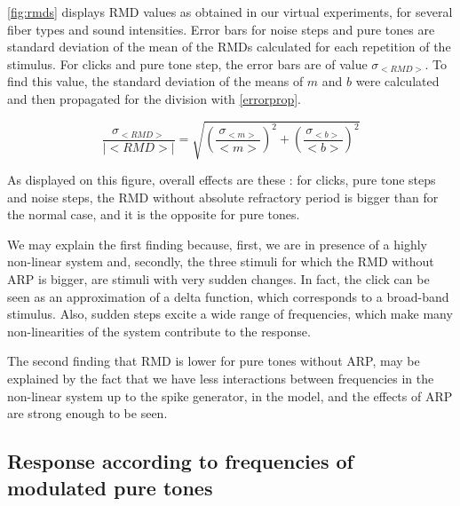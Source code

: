 \autoref{fig:rmds} displays RMD values as obtained in our virtual experiments, 
for several fiber types and sound intensities. 
Error bars for noise steps and pure tones are standard deviation of the mean of the RMDs calculated for each repetition of the stimulus. 
For clicks and pure tone step, the error bars are of value $\sigma_{< RMD >}$. To find this value, the standard deviation of the means of $m$ and $b$ were calculated and then propagated for the division with \autoref{errorprop}.

\begin{equation}\label{errorprop}\frac{\sigma_{< RMD >}}{|<RMD>|}= \sqrt{\left(\frac{\sigma_{< m >}}{< m >}\right)^2 + \left(\frac{\sigma_{< b >}}{< b >}\right)^2} \end{equation}
 
As displayed on this figure, overall effects are these :
for clicks, pure tone steps and noise steps, the RMD without absolute refractory
period is bigger than for the normal case, and it is the opposite for pure tones.


We may explain the first finding because, first, we are in presence of a highly 
non-linear system and, 
secondly, the three stimuli for which the RMD without ARP is bigger, 
are stimuli with very sudden changes. 
In fact, the click can be seen as an approximation of a delta function, 
which corresponds to a broad-band stimulus. 
Also, sudden steps excite a wide range of frequencies, 
which make many non-linearities of the system contribute to the response.


The second finding that RMD is lower for pure tones without ARP, 
may be explained by the fact that we have less 
interactions between frequencies in the non-linear system up to the spike generator, 
in the model,
and the effects of ARP are strong enough to be seen.

\subsection{Response according to frequencies of modulated pure tones}

